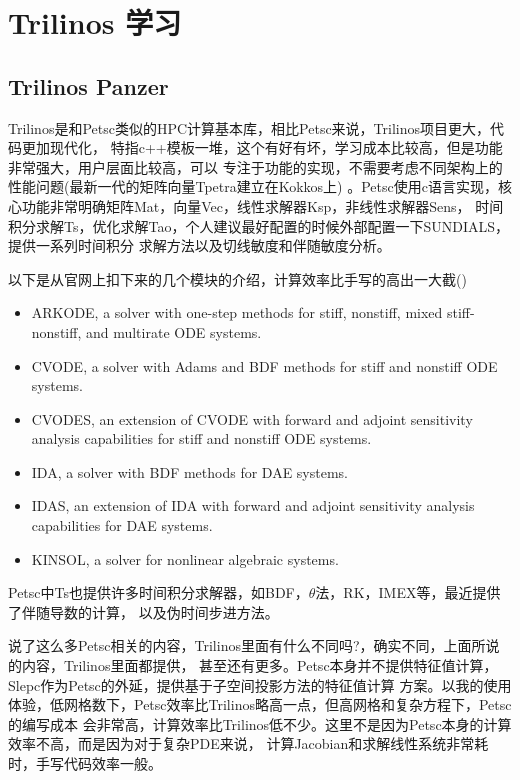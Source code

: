 \documentclass[11pt, a4paper]{ctexart}
\theoremstyle{definition}
\theoremstyle{plain}
\begin{document}




\section{Trilinos 学习}
\subsection{Trilinos Panzer}

Trilinos是和Petsc类似的HPC计算基本库，相比Petsc来说，Trilinos项目更大，代码更加现代化，
特指c++模板一堆，这个有好有坏，学习成本比较高，但是功能非常强大，用户层面比较高，可以
专注于功能的实现，不需要考虑不同架构上的性能问题(最新一代的矩阵向量Tpetra建立在Kokkos上)
。Petsc使用c语言实现，核心功能非常明确矩阵Mat，向量Vec，线性求解器Ksp，非线性求解器Sens，
时间积分求解Ts，优化求解Tao，个人建议最好配置的时候外部配置一下SUNDIALS，提供一系列时间积分
求解方法以及切线敏度和伴随敏度分析。

以下是从官网上扣下来的几个模块的介绍，计算效率比手写的高出一大截()
\begin{itemize}
  \item ARKODE, a solver with one-step methods for stiff, nonstiff, mixed stiff-nonstiff, and multirate ODE systems.
  \item CVODE, a solver with Adams and BDF methods for stiff and nonstiff ODE systems.
  \item CVODES, an extension of CVODE with forward and adjoint sensitivity analysis capabilities for stiff and nonstiff ODE systems.
  \item IDA, a solver with BDF methods for DAE systems.
  \item IDAS, an extension of IDA with forward and adjoint sensitivity analysis capabilities for DAE systems.
  \item KINSOL, a solver for nonlinear algebraic systems.
\end{itemize}
Petsc中Ts也提供许多时间积分求解器，如BDF，$\theta$法，RK，IMEX等，最近提供了伴随导数的计算，
以及伪时间步进方法。

说了这么多Petsc相关的内容，Trilinos里面有什么不同吗?，确实不同，上面所说的内容，Trilinos里面都提供，
甚至还有更多。Petsc本身并不提供特征值计算，Slepc作为Petsc的外延，提供基于子空间投影方法的特征值计算
方案。以我的使用体验，低网格数下，Petsc效率比Trilinos略高一点，但高网格和复杂方程下，Petsc的编写成本
会非常高，计算效率比Trilinos低不少。这里不是因为Petsc本身的计算效率不高，而是因为对于复杂PDE来说，
计算Jacobian和求解线性系统非常耗时，手写代码效率一般。
\end{document}

